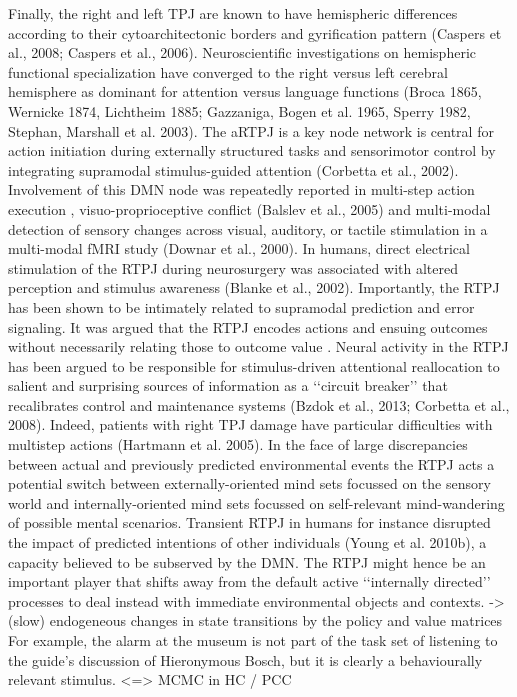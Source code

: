 \documentclass{article} %
\begin{document}
Finally,
the right and left TPJ are known to have hemispheric differences
according to their cytoarchitectonic borders and gyrification pattern
(Caspers et al., 2008; Caspers et al., 2006).
Neuroscientific investigations on hemispheric functional specialization
have converged to the right versus left cerebral hemisphere as dominant for
attention versus language functions (Broca 1865, Wernicke 1874, Lichtheim 1885;
Gazzaniga, Bogen et al. 1965, Sperry 1982, Stephan, Marshall et al. 2003).
%
The aRTPJ is a key node network is central for
action initiation during externally structured tasks and
sensorimotor control by integrating supramodal stimulus-guided attention
(Corbetta et al., 2002).
Involvement of this DMN node was repeatedly reported in
multi-step action execution \cite{hartmann2005takes},
visuo-proprioceptive conflict (Balslev et al., 2005) and
multi-modal detection of sensory changes across
visual, auditory, or tactile stimulation in a multi-modal fMRI study
(Downar et al., 2000).
In humans, direct electrical stimulation of the
RTPJ during neurosurgery was associated with altered perception
and stimulus awareness (Blanke et al., 2002).
%
Importantly, the RTPJ has been shown to be intimately related to
supramodal prediction and error signaling.
It was argued that the RTPJ encodes actions and ensuing outcomes
without necessarily relating those to outcome value
\cite{liljeholm2013neural, hamilton2008action,
jakobs2009effects}.
Neural activity in the RTPJ has been argued to be responsible 
for stimulus-driven attentional reallocation to 
salient and surprising sources of information
as a ‘‘circuit breaker’’ that recalibrates control and maintenance systems
(Bzdok et al., 2013; Corbetta et al., 2008).
Indeed, patients with right TPJ damage have particular difficulties
with multistep actions (Hartmann et al. 2005).
In the face of large discrepancies between actual and previously predicted
environmental events the RTPJ acts a potential switch between
externally-oriented mind sets focussed on the
sensory world and internally-oriented mind sets focussed
on self-relevant mind-wandering of possible mental scenarios.
Transient RTPJ in humans for instance disrupted the
impact of predicted intentions of other individuals (Young et al. 2010b),
a capacity believed to be subserved by the DMN.
The RTPJ might hence be an important player that shifts away
from the default active ‘‘internally directed’’ processes
to deal instead with immediate environmental objects and contexts.
-> (slow) endogeneous changes in state transitions by the policy and value matrices
For example, the alarm at the museum is not part of the task set of listening to the guide’s discussion of Hieronymous Bosch, but it is clearly a behaviourally relevant stimulus. <=> MCMC in HC / PCC
\end{document}
